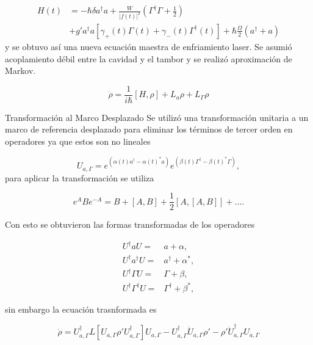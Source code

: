 \documentclass[10pt]{beamer}
\begin{document}
\begin{frame}
\begin{align*}
H(t) &= -\hbar \delta a^\dagger a + \frac{W}{|f(t)|^2}(\Gamma^\dagger \Gamma + \frac{1}{2}) \\
&+  g'a^\dagger a[\gamma_+(t)\Gamma (t) +\gamma_-(t)\Gamma^\dagger (t)] + \hbar\frac{\Omega}{2}(a^\dagger + a)
\end{align*} y se obtuvo así una nueva ecuación maestra de enfriamiento laser. Se asumió acoplamiento débil entre la cavidad y el tambor y se realizó aproximación de Markov.

\begin{equation*}
\dot{\rho} = \frac{1}{i\hbar}[H,\rho] + L_a\rho + L_\Gamma \rho
\end{equation*}
\end{frame}

\begin{frame}{Transformación al Marco Desplazado}
Se utilizó una transformación unitaria a un marco de referencia desplazado para eliminar los términos de tercer orden en operadores ya que estos son no lineales

\begin{equation*}
U_{a,\Gamma} = e^{(\alpha(t) a^\dagger - \alpha(t)^*a)}e^{(\beta(t) \Gamma^\dagger - \beta(t)^*\Gamma)},
\end{equation*} para aplicar la transformación se utiliza

\begin{equation*}
e^{A} B e^{-A} = B + [A,B] + \frac{1}{2}[A,[A,B]] + ... .
\end{equation*}
\end{frame}

\begin{frame}
Con esto se obtuvieron las formas transformadas de los operadores

\begin{align*}
U^{\dagger} a U =& a + \alpha, \\
U^{\dagger} a^{\dagger} U =& a^{\dagger} + \alpha^*, \\
U^{\dagger} \Gamma U =& \Gamma + \beta, \\
U^{\dagger} \Gamma^{\dagger} U =& \Gamma^{\dagger} + \beta^*, 
\end{align*} 

sin embargo la ecuación trasnformada es

\begin{equation*}
\dot{\rho} = U_{a,\Gamma}^\dagger L[U_{a,\Gamma} \rho' U_{a,\Gamma}^\dagger]U_{a,\Gamma}-U_{a,\Gamma}^\dagger\dot{U}_{a,\Gamma}\rho'-\rho'\dot{U}_{a,\Gamma}^\dagger U_{a,\Gamma}
\end{equation*}

\end{frame}
\end{document}
